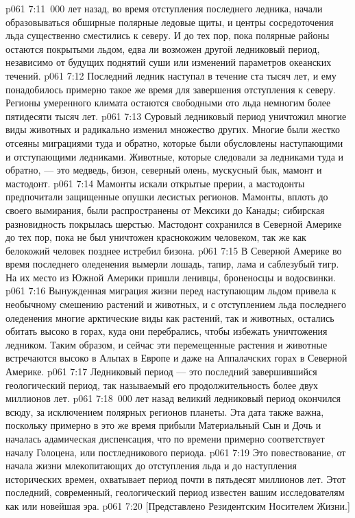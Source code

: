 \vs p061 7:11 \,000 лет назад, во время отступления последнего ледника, начали образовываться обширные полярные ледовые щиты, и центры сосредоточения льда существенно сместились к северу. И до тех пор, пока полярные районы остаются покрытыми льдом, едва ли возможен другой ледниковый период, независимо от будущих поднятий суши или изменений параметров океанских течений.
\vs p061 7:12 Последний ледник наступал в течение ста тысяч лет, и ему понадобилось примерно такое же время для завершения отступления к северу. Регионы умеренного климата остаются свободными ото льда немногим более пятидесяти тысяч лет.
\vs p061 7:13 Суровый ледниковый период уничтожил многие виды животных и радикально изменил множество других. Многие были жестко отсеяны миграциями туда и обратно, которые были обусловлены наступающими и отступающими ледниками. Животные, которые следовали за ледниками туда и обратно, --- это медведь, бизон, северный олень, мускусный бык, мамонт и мастодонт.
\vs p061 7:14 Мамонты искали открытые прерии, а мастодонты предпочитали защищенные опушки лесистых регионов. Мамонты, вплоть до своего вымирания, были распространены от Мексики до Канады; сибирская разновидность покрылась шерстью. Мастодонт сохранился в Северной Америке до тех пор, пока не был уничтожен краснокожим человеком, так же как белокожий человек позднее истребил бизона.
\vs p061 7:15 В Северной Америке во время последнего оледенения вымерли лошадь, тапир, лама и саблезубый тигр. На их место из Южной Америки пришли ленивцы, броненосцы и водосвинки.
\vs p061 7:16 Вынужденная миграция жизни перед наступающим льдом привела к необычному смешению растений и животных, и с отступлением льда последнего оледенения многие арктические виды как растений, так и животных, остались обитать высоко в горах, куда они перебрались, чтобы избежать уничтожения ледником. Таким образом, и сейчас эти перемещенные растения и животные встречаются высоко в Альпах в Европе и даже на Аппалачских горах в Северной Америке.
\vs p061 7:17 \pc Ледниковый период --- это последний завершившийся геологический период, так называемый  его продолжительность более двух миллионов лет.
\vs p061 7:18 \,000 лет назад великий ледниковый период окончился всюду, за исключением полярных регионов планеты. Эта дата также важна, поскольку примерно в это же время прибыли Материальный Сын и Дочь и началась адамическая диспенсация, что по времени примерно соответствует началу Голоцена, или постледникового периода.
\vs p061 7:19 \pc Это повествование, от начала жизни млекопитающих до отступления льда и до наступления исторических времен, охватывает период почти в пятьдесят миллионов лет. Этот последний, современный, геологический период известен вашим исследователям как  или новейшая эра.
\vsetoff
\vs p061 7:20 [Представлено Резидентским Носителем Жизни.]
